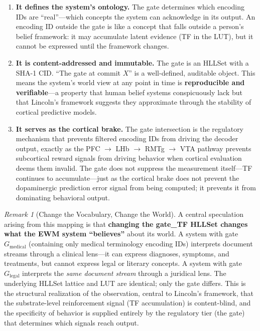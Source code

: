 \documentclass[11pt,a4paper]{article}
\theoremstyle{remark}
\newtheorem{remark}{Remark}[section]
\begin{document}
\begin{enumerate}[leftmargin=*,nosep]
  \item \textbf{It defines the system's ontology.} The gate determines which
    encoding IDs are ``real''---which concepts the system can acknowledge in
    its output. An encoding ID outside the gate is like a concept that falls
    outside a person's belief framework: it may accumulate latent evidence (TF
    in the LUT), but it cannot be expressed until the framework changes.
  \item \textbf{It is content-addressed and immutable.} The gate is an
    HLLSet with a SHA-1 CID. ``The gate at commit $X$'' is a well-defined,
    auditable object. This means the system's world view at any point in time
    is \textbf{reproducible and verifiable}---a property that human belief
    systems conspicuously lack but that Lincoln's framework suggests they
    approximate through the stability of cortical predictive models.
  \item \textbf{It serves as the cortical brake.} The gate intersection is
    the regulatory mechanism that prevents filtered encoding IDs from driving
    the decoder output, exactly as the PFC $\to$ LHb $\to$ RMTg $\to$ VTA
    pathway prevents subcortical reward signals from driving behavior when
    cortical evaluation deems them invalid. The gate does not suppress the
    measurement itself---TF continues to accumulate---just as the cortical
    brake does not prevent the dopaminergic prediction error signal from being
    computed; it prevents it from dominating behavioral output.
\end{enumerate}

\begin{remark}[Change the Vocabulary, Change the World]
A central speculation arising from this mapping is that \textbf{changing the
gate\_TF HLLSet changes what the EWM system ``believes''} about its world. A
system with gate $G_{\text{medical}}$ (containing only medical terminology
encoding IDs) interprets document streams through a clinical lens---it can
express diagnoses, symptoms, and treatments, but cannot express legal or
literary concepts. A system with gate $G_{\text{legal}}$ interprets the
\textit{same document stream} through a juridical lens. The underlying HLLSet
lattice and LUT are identical; only the gate differs. This is the structural
realization of the observation, central to Lincoln's framework, that the
substrate-level reinforcement signal (TF accumulation) is content-blind, and
the specificity of behavior is supplied entirely by the regulatory tier (the
gate) that determines which signals reach output.
\end{remark}
\end{document}
